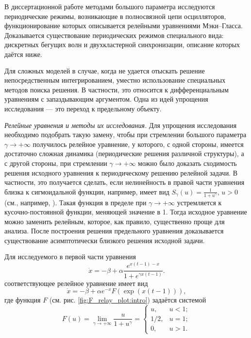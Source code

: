В диссертационной работе методами большого параметра исследуются периодические режимы, возникающие в полносвязной цепи осцилляторов, функционирование которых описывается релейными уравнениями Мэки--Гласса. Доказывается существование периодических режимов специального вида: дискретных бегущих волн и двухкластерной синхронизации, описание которых даётся ниже.

{\methods} Для сложных моделей в случае, когда не удается отыскать решение непосредственным интегрированием, уместно использование специальных методов поиска решения. В частности, это относится к дифференциальным уравнениям с запаздывающим аргументом. Одна из идей упрощения исследования --- это переход к предельному объекту.

\textit{Релейные уравнения и методы их исследования.} Для упрощения исследования необходимо подобрать такую замену, чтобы при стремлении большого параметра $\gamma \to +\infty$ получилось релейное уравнение, у которого, с одной стороны, имеется достаточно сложная динамика (периодические решения различной структуры), а с другой стороны, при стремлении $\gamma \to +\infty$ можно было доказать сходимость решения исходного уравнения к периодическому решению релейной задачи. В частности, это получается сделать, если нелинейность в правой части уравнения близка к сигмоидальной функции, например, имеет вид $S_\gamma(u)=\frac{1}{1 + u^\gamma}$, $u > 0$ (см., например, \cite{Preobrazhenskaya2020, Glyzin2017, Krisztin2020, Bartha2021}). Такая функция в пределе при $\gamma\to+\infty$ устремляется к кусочно-постоянной функции, меняющей значение в 1. Тогда исходное уравнение можно заменить релейным, которое, как правило, существенно проще для анализа. После построения решения предельного уравнения доказывается существование асимптотически близкого решения исходной задачи.

Для исследуемого в первой части уравнения
\begin{equation}
\label{eq:intro:MG_norm1}
	\dot{x}=-\beta+\alpha\frac{e^{x(t-1)-x}}{1+e^{\gamma x(t-1)}}.
\end{equation}
соответствующее релейное уравнение имеет вид
\[
\dot{x}=-\beta + \alpha e^{-x} F(\exp({x(t-1)})),
\]
где функция $F$ (см. рис. \ref{fig:F_relay_plot:intro}) задаётся системой
\begin{equation}
	\label{eq:intro:F_relay}
	F(u)=\lim\limits_{\gamma\to +\infty}\frac{u}{1+u^{\gamma}} = 
	\begin{cases}
		u, & u < 1;\\
		1/2, & u = 1;\\
		0, & u > 1.
	\end{cases}
\end{equation}

